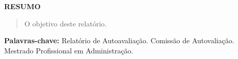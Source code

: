 \newenvironment{meuresumo}{
  \clearpage
  \small
  \vspace{-1cm}
  \begin{center}
    \bfseries RESUMO
    \vspace{0.5em}
  \end{center}
  \begin{quote}
}{
  \end{quote}
  \vspace{-1.1em}
  \begin{center}
  \begin{minipage}{0.87\textwidth} 
  \textbf{Palavras-chave:} Relatório de Autoavaliação. 
  Comissão de Autovaliação. Mestrado Profissional em Administração.
  \end{minipage}
  \end{center}
  \clearpage
}

\begin{meuresumo}
O objetivo deste relatório.
\end{meuresumo}



\clearpage
{}


